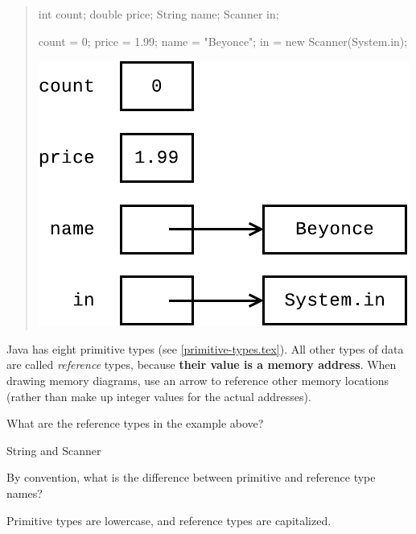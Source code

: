 
\begin{quote}
\begin{multicols}{2}

\begin{javalst}
int count;
double price;
String name;
Scanner in;

count = 0;
price = 1.99;
name = "Beyonce";
in = new Scanner(System.in);
\end{javalst}

\includegraphics[width=\linewidth]{reference1.pdf}

\end{multicols}
\end{quote}

Java has eight primitive types (see \ref{primitive-types.tex}).
All other types of data are called \emph{reference} types, because \textbf{their value is a memory address}.
When drawing memory diagrams, use an arrow to reference other memory locations (rather than make up integer values for the actual addresses).




\Q What are the reference types in the example above?

\begin{answer}
String and Scanner
\end{answer}


\Q By convention, what is the difference between primitive and reference type names?

\begin{answer}
Primitive types are lowercase, and reference types are capitalized.
\end{answer}


